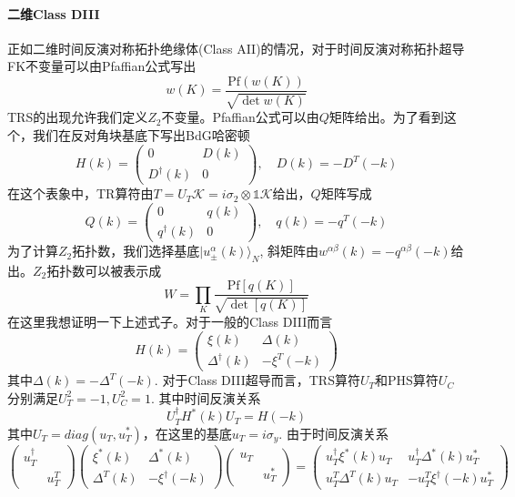 \documentclass{article}
\numberwithin{equation}{subsection}
\begin{document}
\paragraph{二维Class DIII}
正如二维时间反演对称拓扑绝缘体(Class AII)的情况，对于时间反演对称拓扑超导FK不变量可以由Pfaffian公式写出
\begin{equation}
    w(K)=\frac{\mathrm{Pf}(w(K))}{\sqrt{\det w(K)}}
\end{equation}
TRS的出现允许我们定义$Z_2$不变量。Pfaffian公式可以由$Q$矩阵给出。为了看到这个，我们在反对角块基底下写出BdG哈密顿
\begin{equation}
    H(k)=\begin{pmatrix}
        0&D(k)\\
        D^\dagger(k)&0
    \end{pmatrix},\quad D(k)=-D^T(-k)
\end{equation}
在这个表象中，TR算符由$T=U_T\mathcal{K}=i\sigma_2\otimes\mathbb{1}\mathcal{K}$给出，$Q$矩阵写成
\begin{equation}
    Q(k)=\begin{pmatrix}
        0&q(k)\\
        q^\dagger(k)&0
    \end{pmatrix},\quad q(k)=-q^T(-k)
\end{equation}
为了计算$Z_2$拓扑数，我们选择基底$|u_\pm^\alpha(k)\rangle_N$, 斜矩阵由$w^{\alpha\beta}(k)=-q^{\alpha\beta}(-k)$给出。$Z_2$拓扑数可以被表示成
\begin{equation}
    W=\prod_{K}\frac{\mathrm{Pf}[q(K)]}{\sqrt{\det[q(K)]}}
\end{equation}
在这里我想证明一下上述式子。对于一般的Class DIII而言
\begin{equation}
    H(k)=\begin{pmatrix}
        \xi(k)&\Delta(k)\\
        \Delta^\dagger(k)&-\xi^T(-k)
    \end{pmatrix}
\end{equation}
其中$\Delta(k)=-\Delta^T(-k)$. 对于Class DIII超导而言，TRS算符$U_T$和PHS算符$U_C$分别满足$U_T^2=-1,U_C^2=1$. 其中时间反演关系
\begin{equation}
    U_T^\dagger H^*(k)U_T=H(-k)
\end{equation}
其中$U_T=diag(u_T,u_T^*)$，在这里的基底$u_T=i\sigma_y$. 由于时间反演关系
\begin{equation}
    \begin{pmatrix}
        u_T^\dagger\\
        &u_T^T
    \end{pmatrix}\begin{pmatrix}
        \xi^*(k)&\Delta^*(k)\\
        \Delta^T(k)&-\xi^\dagger(-k)
    \end{pmatrix}\begin{pmatrix}
        u_T&\\
        &u_T^*
    \end{pmatrix}=\begin{pmatrix}
        u_T^\dagger\xi^*(k)u_T&u_T^\dagger\Delta^*(k)u_T^*\\
        u_T^T\Delta^T(k)u_T&-u_T^T\xi^\dagger(-k)u_T^*
    \end{pmatrix}
\end{equation}
\end{document}
